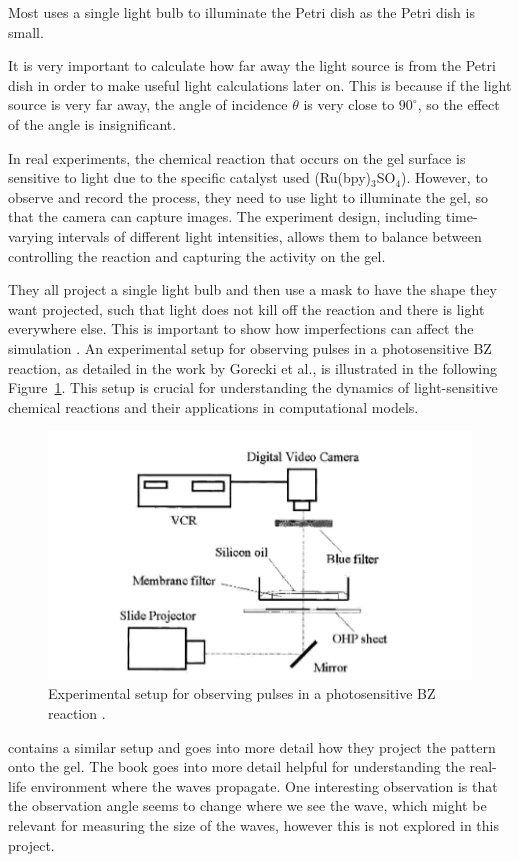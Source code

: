 Most uses a single light bulb to illuminate the Petri dish as the Petri dish is small. 

It is very important to calculate how far away the light source is from the Petri dish in order to make useful light calculations later on. This is because if the light source is very far away, the angle of incidence $\theta$ is very close to $90^\circ$, so the effect of the angle is insignificant.

In real experiments, the chemical reaction that occurs on the gel surface is sensitive to light due to the specific catalyst used (Ru(bpy)$_3$SO$_4$). 
However, to observe and record the process, they need to use light to illuminate the gel, so that the camera can capture images. The experiment design, including time-varying intervals of different light intensities, allows them to balance between controlling the reaction and capturing the activity on the gel. \cite{TOTH20091605}

They all project a single light bulb and then use a mask to have the shape they want projected, such that light does not kill off the reaction and there is light everywhere else. This is important to show how imperfections can affect the simulation . \cite{gorecki2003chemical}
An experimental setup for observing pulses in a photosensitive BZ reaction, as detailed in the work by Gorecki et al., is illustrated in the following Figure~\ref{fig:gorecki-setup}. This setup is crucial for understanding the dynamics of light-sensitive chemical reactions and their applications in computational models.

\begin{figure}[H]
    \centering
    \includegraphics[width=0.7\linewidth]{images/Screenshot 2024-03-10 at 20.23.20.png}
    \caption{Experimental setup for observing pulses in a photosensitive BZ reaction \citep{gorecki2003chemical}.}
    \label{fig:gorecki-setup}
\end{figure}

\cite[71]{cui2004synchronization} contains a similar setup and goes into more detail how they project the pattern onto the gel. 
The book goes into more detail helpful for understanding the real-life environment where the waves propagate. 
One interesting observation is that the observation angle seems to change where we see the wave, which might be relevant for measuring the size of the waves, however this is not explored in this project.


